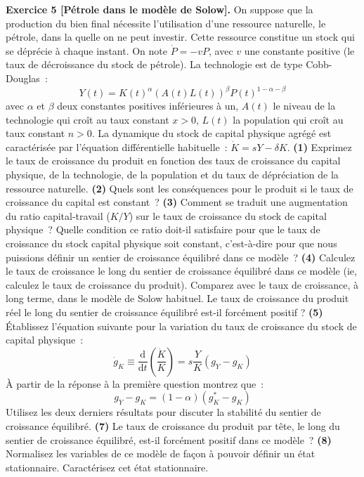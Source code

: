 \documentclass[12pt,a4paper,notitlepage,twocolumn]{article}
\begin{document}
\textbf{Exercice 5 [Pétrole dans le modèle de Solow].} On
suppose que la production du bien final nécessite l'utilisation
d'une ressource naturelle, le pétrole, dans la quelle on ne peut
investir. Cette ressource constitue un stock qui se déprécie à
chaque instant. On note $\dot{P} = - v P$, avec $v$ une constante
positive (le taux de décroissance du stock de pétrole). La
technologie est de type Cobb-Douglas~:
\[
Y(t) = K(t)^{\alpha}(A(t)L(t))^{\beta}P(t)^{1-\alpha-\beta}
\]
avec $\alpha$ et $\beta$ deux constantes positives inférieures à un,
$A(t)$ le niveau de la technologie qui croît au taux constant $x>0$,
$L(t)$ la population qui croît au taux constant $n>0$. La dynamique
du stock de capital physique agrégé est caractérisée par l'équation
différentielle habituelle~: $\dot{K} = sY - \delta K$. \textbf{(1)}
Exprimez le taux de croissance du produit en fonction des taux de
croissance du capital physique, de la technologie, de la population
et du taux de dépréciation de la ressource naturelle. \textbf{(2)}
Quels sont les conséquences pour le produit si le taux de croissance
du capital est constant~? \textbf{(3)} Comment se traduit une
augmentation du ratio capital-travail ($K/Y$) sur le taux de
croissance du stock de capital physique~? Quelle condition ce ratio
doit-il satisfaire pour que le taux de croissance du stock capital
physique soit constant, c'est-à-dire pour que nous puissions définir
un sentier de croissance équilibré dans ce modèle~? \textbf{(4)}
Calculez le taux de croissance le long du sentier de croissance
équilibré dans ce modèle (ie, calculez le taux de croissance du
produit). Comparez avec le taux de croissance, à long terme, dans le
modèle de Solow habituel. Le taux de croissance du produit réel le
long du sentier de croissance équilibré est-il forcément positif ?
\textbf{(5)} \'Etablissez l'équation suivante pour la variation du
taux de croissance du stock de capital physique~:
\[
\dot{g}_K \equiv \frac{\mathrm d}{\mathrm dt}\left(
\frac{\dot{K}}{K}\right) = s\frac{Y}{K}\left(g_Y-g_K\right)
\]
\`A partir de la réponse à la première question montrez que~:
\[
g_Y-g_K = (1-\alpha)\left(g_K^*-g_K\right)
\]
Utilisez les deux derniers résultats pour discuter la stabilité du
sentier de croissance équilibré. \textbf{(7)} Le taux de croissance
du produit par tête, le long du sentier de croissance équilibré,
est-il forcément positif dans ce modèle~? \textbf{(8)} Normalisez
les variables de ce modèle de façon à pouvoir définir un état
stationnaire. Caractérisez cet état stationnaire.
\end{document}

